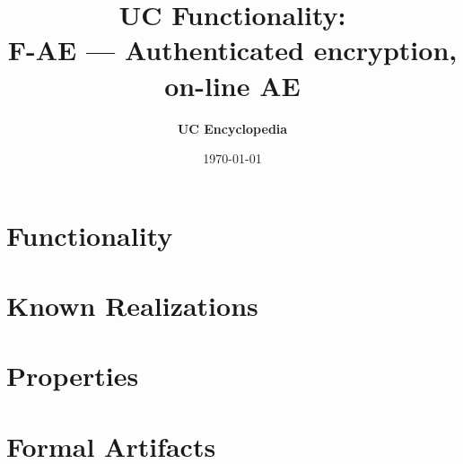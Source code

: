 \documentclass[11pt,a4paper]{article}
\title{\textbf{\Large UC Functionality:}\\[0.2em] \Large F-AE --- Authenticated encryption, on-line AE}
\author{\textbf{UC Encyclopedia}}
\date{\today}
\newtheorem{functionality}{Functionality}
\begin{document}
\maketitle

\begin{abstract}
\end{abstract}

\section{Functionality}

%

\section{Known Realizations}


\section{Properties}


\section{Formal Artifacts}

\end{document}
